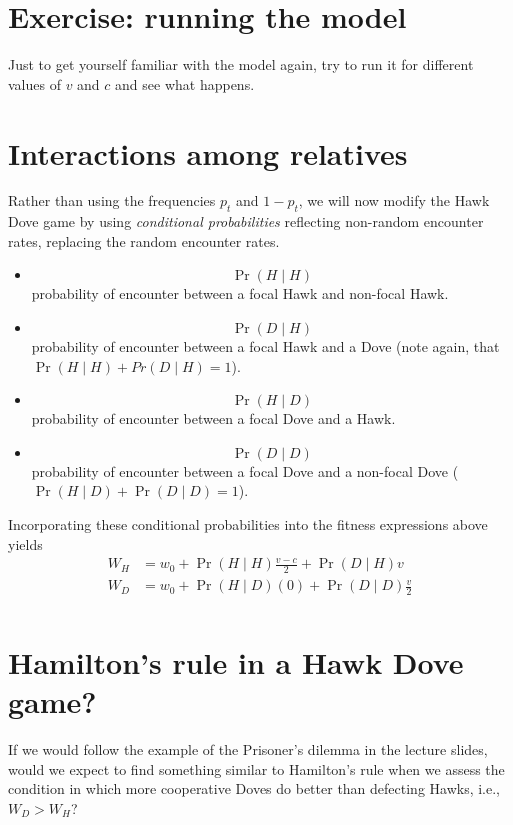 \documentclass[
]{book}
\providecommand{\tightlist}{%
  \setlength{\itemsep}{0pt}\setlength{\parskip}{0pt}}
\begin{document}
\section{Exercise: running the model}\label{exercise-running-the-model}

Just to get yourself familiar with the model again, try to run it for different values of \(v\) and \(c\) and see what happens.

\section{Interactions among relatives}\label{interactions-among-relatives}

Rather than using the frequencies \(p_{t}\) and \(1-p_{t}\), we will now modify the Hawk Dove game by using \emph{conditional probabilities} reflecting non-random encounter rates, replacing the random encounter rates.

\begin{itemize}
\tightlist
\item
  \[\Pr(H \mid H)\] probability of encounter between a focal Hawk and non-focal Hawk.
\item
  \[\Pr(D \mid H)\] probability of encounter between a focal Hawk and a Dove (note again, that \(\Pr(H \mid H) + Pr(D \mid H) = 1\)).
\item
  \[\Pr(H \mid D)\] probability of encounter between a focal Dove and a Hawk.
\item
  \[\Pr(D \mid D)\] probability of encounter between a focal Dove and a non-focal Dove (\(\Pr(H \mid D) + \Pr(D \mid D) = 1\)).
\end{itemize}

Incorporating these conditional probabilities into the fitness expressions above yields
\begin{align}
W_{H} &= w_{0} + \Pr(H\mid H) \frac{v-c}{2} +  \Pr (D \mid H ) v \label{eq:wH} \\
W_{D} &= w_{0} + \Pr (H \mid D) (0) + \Pr ( D \mid D )  \frac{v}{2} \label{eq:wD}\\
\end{align}

\section{Hamilton's rule in a Hawk Dove game?}\label{hamiltons-rule-in-a-hawk-dove-game}

If we would follow the example of the Prisoner's dilemma in the lecture slides, would we expect to find something similar to Hamilton's rule when we assess the condition in which more cooperative Doves do better than defecting Hawks, i.e., \(W_{D} > W_{H}\)?
\end{document}
